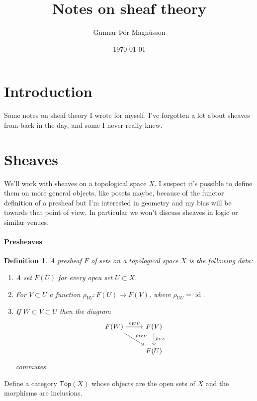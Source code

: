 \documentclass[10pt,a4paper]{article}
\author{Gunnar Þór Magnússon}
\date{\today}
\title{Notes on sheaf theory}
\newtheorem{defi}[theo]{Definition}
\newcommand{\sh}[1]{#1}
\newcommand{\cat}[1]{\mathsf{#1}}
\DeclareMathOperator{\id}{id}
\begin{document}
\maketitle


\section*{Introduction}

Some notes on sheaf theory I wrote for myself.
I've forgotten a lot about sheaves from back in the day, and some I never
really knew.



\section{Sheaves}

We'll work with sheaves on a topological space $X$.
I suspect it's possible to define them on more general objects, like posets
maybe, because of the functor definition of a presheaf but I'm interested in
geometry and my bias will be towards that point of view.
In particular we won't discuss sheaves in logic or similar venues.


\paragraph{Presheaves}

\begin{defi}
A \emph{presheaf} $\sh{F}$ of sets on a topological space $X$ is the following
data:
\begin{enumerate}
\item
A set $\sh{F}(U)$ for every open set $U \subset X$.

\item
For $V \subset U$ a function $\rho_{VU} : \sh{F}(U) \to \sh{F}(V)$, where $\rho_{UU} = \id$.

\item
If $W \subset V \subset U$ then the diagram
$$
\begin{tikzcd}
\sh{F}(W) \ar[r,"\rho_{WV}"] \ar[dr,"\rho_{WU}"] & \sh{F}(V) \ar[d,"\rho_{VU}"]
\\
                & \sh{F}(U)
\end{tikzcd}
$$
commutes.
\end{enumerate}
\end{defi}

Define a category $\cat{Top}(X)$ whose objects are the open sets of $X$ and the
morphisms are inclusions.
\end{document}

